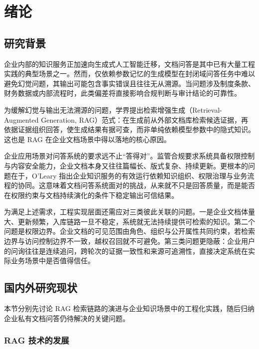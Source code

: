 
\chapter{绪论}
\label{cha:introduction}

\section{研究背景}
\label{sec:background}

企业内部的知识服务正加速向生成式人工智能迁移，文档问答是其中已有大量工程实践的典型场景之一\cite{feuerriegel2024generative}。然而，仅依赖参数记忆的生成模型在封闭域问答任务中难以避免幻觉问题，其输出可能包含事实错误且往往无从溯源\cite{zhang2025hallucination}。当问题涉及制度条款、财务数据或内部流程时，此类偏差将直接影响合规判断与审计结论的可靠性。

为缓解幻觉与输出无法溯源的问题，学界提出检索增强生成（Retrieval-Augmented Generation, RAG）范式：在生成前从外部文档库检索候选证据，再依据证据组织回答，使生成结果有据可查，而非单纯依赖模型参数中的隐式知识。这也是 RAG 在企业文档场景中得以落地的核心原因。

企业应用场景对问答系统的要求远不止“答得对”。监管合规要求系统具备权限控制与内容安全能力\cite{genai_measures2023}，企业文档本身又往往篇幅长、版式复杂、持续更新。更根本的问题在于，O'Leary 指出企业知识服务的有效运行依赖知识组织、权限治理与业务流程的协同\cite{oleary2024km}。这意味着文档问答系统面对的挑战，从来就不只是回答质量，而是能否在权限约束与文档持续演化的条件下稳定输出可信结果。

为满足上述需求，工程实现层面还需应对三类彼此关联的问题。一是企业文档体量大、更新频繁，入库链路一旦不稳定，系统就无法持续提供可检索的知识。第二个问题是权限边界。企业文档的可见范围由角色、组织与公开属性共同约束，若检索边界与访问控制边界不一致，越权召回就不可避免。第三类问题更隐蔽：企业用户的问询往往是连续追问，跨轮次的证据一致性和来源可追溯性，直接决定系统在实际业务场景中是否值得信任。

\section{国内外研究现状}
\label{sec:related_work}

本节分别先讨论 RAG 检索链路的演进与企业知识场景中的工程化实践，随后归纳企业私有文档问答仍待解决的关键问题。

\subsection{RAG 技术的发展}

